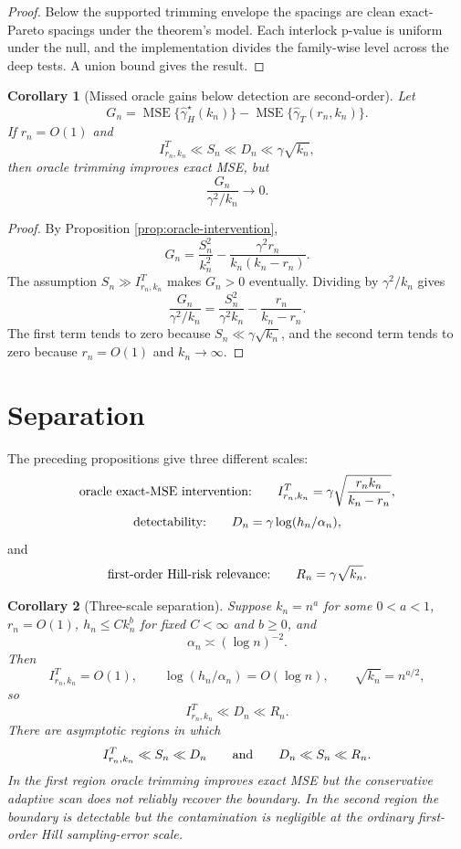 \documentclass[11pt]{article}
\newtheorem{corollary}{Corollary}
\begin{document}
\begin{proof}
Below the supported trimming envelope the spacings are clean exact-Pareto
spacings under the theorem's model.  Each interlock p-value is uniform under
the null, and the implementation divides the family-wise level across the deep
tests.  A union bound gives the result.
\end{proof}

\begin{corollary}[Missed oracle gains below detection are second-order]
\label{cor:missed-gain}
Let
\[
  G_n
  =
  \operatorname{MSE}\{\widehat\gamma_H^\star(k_n)\}
  -
  \operatorname{MSE}\{\widehat\gamma_T(r_n,k_n)\}.
\]
If $r_n=O(1)$ and
\[
  I^{T}_{r_n,k_n}\ll S_n\ll D_n\ll\gamma\sqrt{k_n},
\]
then oracle trimming improves exact MSE, but
\[
  \frac{G_n}{\gamma^2/k_n}\to0.
\]
\end{corollary}

\begin{proof}
By Proposition \ref{prop:oracle-intervention},
\[
  G_n
  =
  \frac{S_n^2}{k_n^2}
  -
  \frac{\gamma^2r_n}{k_n(k_n-r_n)}.
\]
The assumption $S_n\gg I^{T}_{r_n,k_n}$ makes $G_n>0$ eventually.  Dividing by
$\gamma^2/k_n$ gives
\[
  \frac{G_n}{\gamma^2/k_n}
  =
  \frac{S_n^2}{\gamma^2 k_n}
  -
  \frac{r_n}{k_n-r_n}.
\]
The first term tends to zero because $S_n\ll\gamma\sqrt{k_n}$, and the second
term tends to zero because $r_n=O(1)$ and $k_n\to\infty$.
\end{proof}

\section{Separation}

The preceding propositions give three different scales:
\[
  \hbox{oracle exact-MSE intervention:}
  \qquad
  I^{T}_{r_n,k_n}
  =
  \gamma\sqrt{\frac{r_nk_n}{k_n-r_n}},
\]
\[
  \hbox{detectability:}
  \qquad
  D_n
  =
  \gamma\log(h_n/\alpha_n),
\]
and
\[
  \hbox{first-order Hill-risk relevance:}
  \qquad
  R_n
  =
  \gamma\sqrt{k_n}.
\]

\begin{corollary}[Three-scale separation]
\label{cor:separation}
Suppose $k_n=n^a$ for some $0<a<1$, $r_n=O(1)$,
$h_n\le Ck_n^b$ for fixed $C<\infty$ and $b\ge0$, and
\[
  \alpha_n\asymp(\log n)^{-2}.
\]
Then
\[
  I^{T}_{r_n,k_n}=O(1),
  \qquad
  \log(h_n/\alpha_n)=O(\log n),
  \qquad
  \sqrt{k_n}=n^{a/2},
\]
so
\[
  I^{T}_{r_n,k_n}\ll D_n\ll R_n.
\]
There are asymptotic regions in which
\[
  I^{T}_{r_n,k_n}\ll S_n\ll D_n
  \qquad\hbox{and}\qquad
  D_n\ll S_n\ll R_n.
\]
In the first region oracle trimming improves exact MSE but the conservative
adaptive scan does not reliably recover the boundary.  In the second region
the boundary is detectable but the contamination is negligible at the ordinary
first-order Hill sampling-error scale.
\end{corollary}
\end{document}
